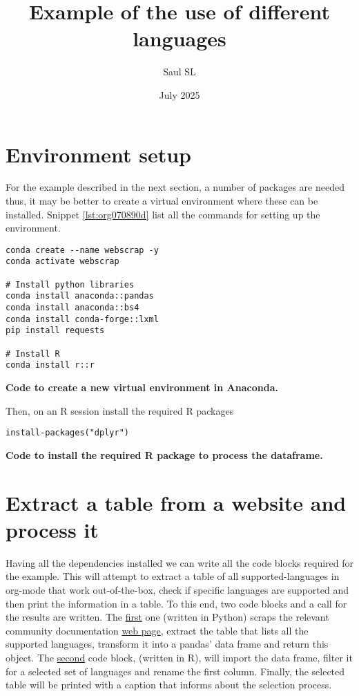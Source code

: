 \documentclass[12pt]{article}
\author{Saul SL}
\date{July 2025}
\title{Example of the use of different languages}
\newenvironment{code}{\captionsetup{labelfont=bf, type=listing, name=Snippet, aboveskip=-3pt ,belowskip=15pt}}{}
\begin{document}
\maketitle
\tableofcontents


\section{Environment setup}
\label{sec:orgf568312}
For the example described in the next section,  a number of packages are needed thus, it may be better to create a virtual environment where these can be installed. Snippet \ref{lst:org070890d} list all the commands for setting up the environment.

\begin{code}
\begin{verbatim}
conda create --name webscrap -y
conda activate webscrap

# Install python libraries
conda install anaconda::pandas
conda install anaconda::bs4
conda install conda-forge::lxml
pip install requests

# Install R
conda install r::r
\end{verbatim}
\caption{\label{lst:org070890d}\textbf{Code to create a new virtual environment in Anaconda.}}
\end{code}

Then, on an R session install the required R packages

\begin{code}
\begin{verbatim}
install-packages("dplyr")
\end{verbatim}
\caption{\label{lst:org526b1a9}\textbf{Code to install the required R package to process the dataframe.}}
\end{code}
\section{Extract a table from a website and process it}
\label{sec:org2efb96a}
Having all the dependencies installed we can write all the code blocks required for the example. This will attempt to extract a table of all supported-languages  in org-mode that work out-of-the-box, check if specific languages are supported and then print the information in a table. To this end, two code blocks  and a call for the results are written.  The \hyperref[lst:org5b0cf49]{first} one (written in Python) scraps  the relevant community documentation \href{https://orgmode.org/worg/org-contrib/babel/languages/}{web page}, extract the  table that lists all the supported languages, transform it into a pandas' data frame and return this object. The \hyperref[tab:org27cd5f7]{second} code block, (written in R), will import the data frame, filter it for a selected set of languages and rename the first column. Finally, the selected table will be printed with a caption that informs about the selection process.
\end{document}
